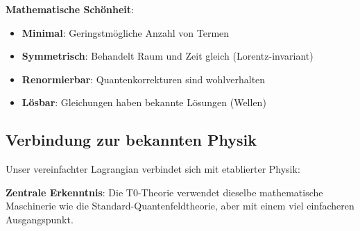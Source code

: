 	\textbf{Mathematische Schönheit}:
	\begin{itemize}
		\item \textbf{Minimal}: Geringstmögliche Anzahl von Termen
		\item \textbf{Symmetrisch}: Behandelt Raum und Zeit gleich (Lorentz-invariant)
		\item \textbf{Renormierbar}: Quantenkorrekturen sind wohlverhalten
		\item \textbf{Lösbar}: Gleichungen haben bekannte Lösungen (Wellen)
	\end{itemize}
	
	\subsection{Verbindung zur bekannten Physik}
	
	Unser vereinfachter Lagrangian verbindet sich mit etablierter Physik:
	
	\begin{table}[htbp]
		\centering
		\caption{Verbindung zur Standard-Feldtheorie}
		\label{tab:standard_connection}
	\end{table}
	
	\textbf{Zentrale Erkenntnis}: Die T0-Theorie verwendet dieselbe mathematische Maschinerie wie die Standard-Quantenfeldtheorie, aber mit einem viel einfacheren Ausgangspunkt.


